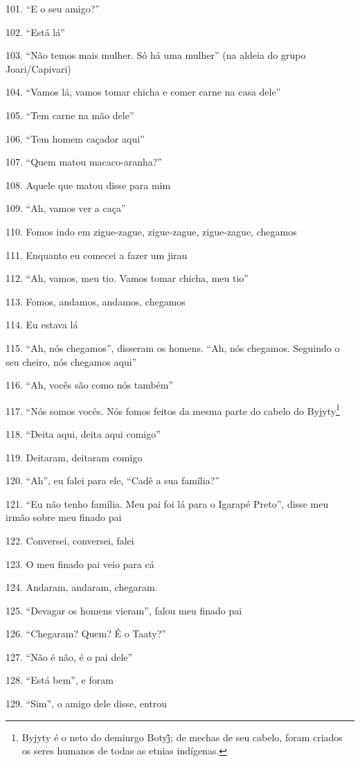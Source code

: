 101. ``E o seu amigo?''

102. ``Está lá''

103. ``Não temos mais mulher. Só há uma mulher'' (na aldeia do grupo
Joari/Capivari)

104. ``Vamos lá, vamos tomar chicha e comer carne na casa dele''

105. ``Tem carne na mão dele''

106. ``Tem homem caçador aqui''

107. ``Quem matou macaco-aranha?''

108. Aquele que matou disse para mim

109. ``Ah, vamos ver a caça''

110. Fomos indo em zigue-zague, zigue-zague, zigue-zague, chegamos

111. Enquanto eu comecei a fazer um jirau

112. ``Ah, vamos, meu tio. Vamos tomar chicha, meu tio''

113. Fomos, andamos, andamos, chegamos

114. Eu estava lá

115. ``Ah, nós chegamos'', disseram os homens. ``Ah, nós chegamos.
Seguindo o seu cheiro, nós chegamos aqui''

116. ``Ah, vocês são como nós também''

117. ``Nós somos vocês. Nós fomos feitos da mesma parte do cabelo do
Byjyty\footnote{Byjyty é o neto do demiurgo Botyj̃; de mechas de seu
  cabelo, foram criados os seres humanos de todas as etnias indígenas.}

118. ``Deita aqui, deita aqui comigo''

119. Deitaram, deitaram comigo

120. ``Ah'', eu falei para ele, ``Cadê a sua família?''

121. ``Eu não tenho família. Meu pai foi lá para o Igarapé Preto'', disse
meu irmão sobre meu finado pai

122. Conversei, conversei, falei

123. O meu finado pai veio para cá

124. Andaram, andaram, chegaram.

125. ``Devagar os homens vieram'', falou meu finado pai

126. ``Chegaram? Quem? É o Taaty?''

127. ``Não é não, é o pai dele''

128. ``Está bem'', e foram

129. ``Sim'', o amigo dele disse, entrou

